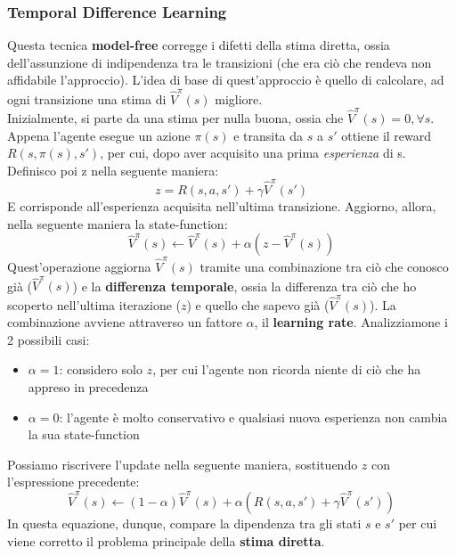 \subsubsection{Temporal Difference Learning}
Questa tecnica \textbf{model-free} corregge i difetti della stima diretta, ossia dell'assunzione di indipendenza tra le transizioni
(che era ciò che rendeva non affidabile l'approccio). L'idea di base di quest'approccio è quello di calcolare, ad ogni transizione
una stima di $\widehat{V}^{\pi}(s)$ migliore.\\
Inizialmente, si parte da una stima per nulla buona, ossia che $\widehat{V}^{\pi}(s) = 0, \forall s$. Appena l'agente esegue
un azione $\pi(s)$ e transita da $s$ a $s'$ ottiene il reward $R(s,\pi(s),s')$, per cui, dopo aver acquisito una prima \textit{esperienza} di 
s. Definisco poi z nella seguente maniera:
\begin{equation}
    z = R(s,a,s') + \gamma \widehat{V}^{\pi}(s')
\end{equation} E corrisponde all'esperienza acquisita nell'ultima transizione. 
Aggiorno, allora, nella seguente maniera la state-function:
\begin{equation}
    \widehat{V}^{\pi}(s) \leftarrow \widehat{V}^{\pi}(s) + \alpha(z - \widehat{V}^{\pi}(s))
\end{equation}
Quest'operazione aggiorna $\widehat{V}^{\pi}(s)$ tramite una combinazione tra ciò che conosco già ($\widehat{V}^{\pi}(s)$) e
la \textbf{differenza temporale}, ossia la differenza tra ciò che ho scoperto nell'ultima iterazione ($z$) 
e quello che sapevo già ($\widehat{V}^{\pi}(s)$). La combinazione avviene attraverso un fattore $\alpha$, il \textbf{learning rate}.
Analizziamone i 2 possibili casi:
\begin{itemize}
    \item $\alpha = 1$: considero solo $z$, per cui l'agente non ricorda niente di ciò che ha appreso in precedenza
    \item $\alpha = 0$: l'agente è molto conservativo e qualsiasi nuova esperienza non cambia la sua state-function 
\end{itemize}
Possiamo riscrivere l'update nella seguente maniera, sostituendo $z$ con l'espressione precedente:
\begin{equation}
    \widehat{V}^{\pi}(s) \leftarrow (1- \alpha)\widehat{V}^{\pi}(s) + \alpha(R(s,a,s') + \gamma \widehat{V}^{\pi}(s'))
\end{equation}
In questa equazione, dunque, compare la dipendenza tra gli stati $s$ e $s'$ per cui viene corretto il problema principale della \textbf{stima diretta}.
